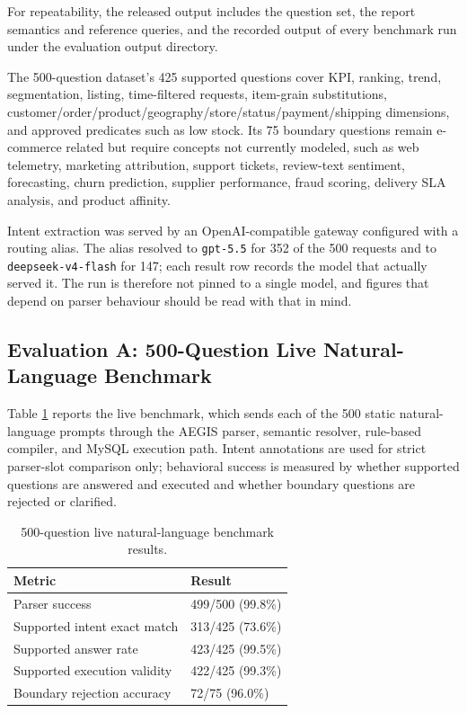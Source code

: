 \documentclass[pdflatex,sn-mathphys-num]{sn-jnl}
\begin{document}
For repeatability, the released output includes the question set, the report semantics and reference queries, and the recorded output of every benchmark run under the evaluation output directory.


The 500-question dataset's 425 supported questions cover KPI, ranking, trend, segmentation, listing, time-filtered requests, item-grain substitutions, customer/order/product/geography/store/status/payment/shipping dimensions, and approved predicates such as low stock. Its 75 boundary questions remain e-commerce related but require concepts not currently modeled, such as web telemetry, marketing attribution, support tickets, review-text sentiment, forecasting, churn prediction, supplier performance, fraud scoring, delivery SLA analysis, and product affinity.


Intent extraction was served by an OpenAI-compatible gateway configured with a routing alias. The alias resolved to \texttt{gpt-5.5} for 352 of the 500 requests and to \texttt{deepseek-v4-flash} for 147; each result row records the model that actually served it. The run is therefore not pinned to a single model, and figures that depend on parser behaviour should be read with that in mind.


\subsection{Evaluation A: 500-Question Live Natural-Language Benchmark}

Table \ref{tab:4} reports the live benchmark, which sends each of the 500 static natural-language prompts through the AEGIS parser, semantic resolver, rule-based compiler, and MySQL execution path. Intent annotations are used for strict parser-slot comparison only; behavioral success is measured by whether supported questions are answered and executed and whether boundary questions are rejected or clarified.


\begin{table}[t]
\caption{500-question live natural-language benchmark results.}
\label{tab:4}
\centering
\renewcommand{\arraystretch}{1.15}
\begin{tabular}{ll}
\toprule
Metric & Result \\
\midrule
Parser success & 499/500 (99.8\%) \\
Supported intent exact match & 313/425 (73.6\%) \\
Supported answer rate & 423/425 (99.5\%) \\
Supported execution validity & 422/425 (99.3\%) \\
Boundary rejection accuracy & 72/75 (96.0\%) \\
\bottomrule
\end{tabular}
\end{table}
\end{document}
